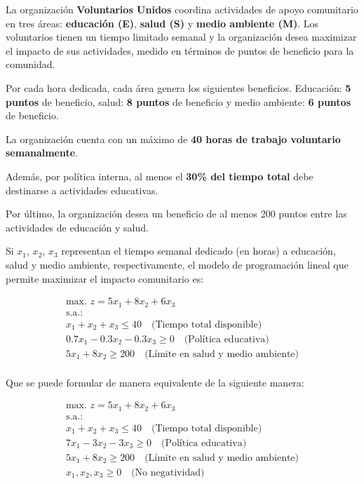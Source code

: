 La organización \textbf{Voluntarios Unidos} coordina actividades de apoyo comunitario en tres áreas: \textbf{educación (E)}, \textbf{salud (S)} y \textbf{medio ambiente (M)}. Los voluntarios tienen un tiempo limitado semanal y la organización desea maximizar el impacto de sus actividades, medido en términos de puntos de beneficio para la comunidad.

Por cada hora dedicada, cada área genera los siguientes beneficios. Educación: \textbf{5 puntos} de beneficio, salud: \textbf{8 puntos} de beneficio y medio ambiente: \textbf{6 puntos} de beneficio.

La organización cuenta con un máximo de \textbf{40 horas de trabajo voluntario semanalmente}. 

Además, por política interna, al menos el \textbf{30\% del tiempo total} debe destinarse a actividades educativas.

Por último, la organización desea un beneficio de al menos 200 puntos entre las actividades de educación y salud.

Si $x_1$, $x_2$, $x_3$ representan el tiempo semanal dedicado (en horas) a educación, salud y medio ambiente, respectivamente, el modelo de programación lineal que permite maximizar el impacto comunitario es:


\begin{equation}
\begin{split}
\text{max. } z = 5x_1 + 8x_2 + 6x_3 \\
\text{s.a.:} \\
x_1 + x_2 + x_3 \leq 40 \quad \text{(Tiempo total disponible)} \\
0.7x_1 - 0.3x_2 - 0.3x_3 \geq 0 \quad \text{(Política educativa)}\\
5x_1 + 8x_2 \geq 200 \quad \text{(Límite en salud y medio ambiente)} \\
\end{split}
\end{equation}

Que se puede formular de manera equivalente de la siguiente manera:


\begin{equation}
\begin{split}
\text{max. } z = 5x_1 + 8x_2 + 6x_3 \\
\text{s.a.:} \\
x_1 + x_2 + x_3 \leq 40 \quad \text{(Tiempo total disponible)} \\
7x_1 - 3x_2 - 3x_3 \geq 0 \quad \text{(Política educativa)} \\
5x_1 + 8x_2 \geq 200 \quad \text{(Límite en salud y medio ambiente)} \\
x_1, x_2, x_3 \geq 0 \quad \text{(No negatividad)}
\end{split}
\end{equation}

